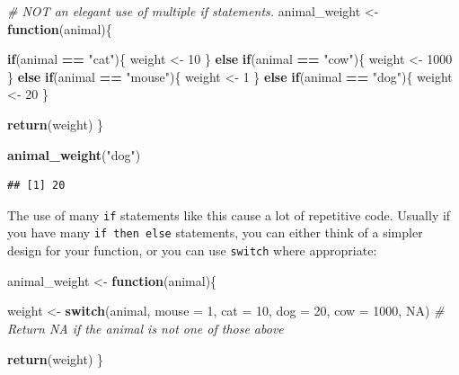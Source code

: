 \documentclass[]{book}
\newenvironment{Shaded}{\begin{snugshade}}{\end{snugshade}}
\newcommand{\CommentTok}[1]{\textcolor[rgb]{0.56,0.35,0.01}{\textit{#1}}}
\newcommand{\ControlFlowTok}[1]{\textcolor[rgb]{0.13,0.29,0.53}{\textbf{#1}}}
\newcommand{\DataTypeTok}[1]{\textcolor[rgb]{0.13,0.29,0.53}{#1}}
\newcommand{\DecValTok}[1]{\textcolor[rgb]{0.00,0.00,0.81}{#1}}
\newcommand{\KeywordTok}[1]{\textcolor[rgb]{0.13,0.29,0.53}{\textbf{#1}}}
\newcommand{\NormalTok}[1]{#1}
\newcommand{\OperatorTok}[1]{\textcolor[rgb]{0.81,0.36,0.00}{\textbf{#1}}}
\newcommand{\OtherTok}[1]{\textcolor[rgb]{0.56,0.35,0.01}{#1}}
\newcommand{\StringTok}[1]{\textcolor[rgb]{0.31,0.60,0.02}{#1}}
\begin{document}
\begin{Shaded}
\begin{Highlighting}[]
\CommentTok{# NOT an elegant use of multiple if statements.}
\NormalTok{animal_weight <-}\StringTok{ }\ControlFlowTok{function}\NormalTok{(animal)\{}
  
  \ControlFlowTok{if}\NormalTok{(animal }\OperatorTok{==}\StringTok{ "cat"}\NormalTok{)\{}
\NormalTok{    weight <-}\StringTok{ }\DecValTok{10}
\NormalTok{  \} }\ControlFlowTok{else} \ControlFlowTok{if}\NormalTok{(animal }\OperatorTok{==}\StringTok{ "cow"}\NormalTok{)\{}
\NormalTok{    weight <-}\StringTok{ }\DecValTok{1000}
\NormalTok{  \} }\ControlFlowTok{else} \ControlFlowTok{if}\NormalTok{(animal }\OperatorTok{==}\StringTok{ "mouse"}\NormalTok{)\{}
\NormalTok{    weight <-}\StringTok{ }\DecValTok{1}
\NormalTok{  \} }\ControlFlowTok{else} \ControlFlowTok{if}\NormalTok{(animal }\OperatorTok{==}\StringTok{ "dog"}\NormalTok{)\{}
\NormalTok{    weight <-}\StringTok{ }\DecValTok{20}
\NormalTok{  \}}
  
\KeywordTok{return}\NormalTok{(weight)}
\NormalTok{\}}


\KeywordTok{animal_weight}\NormalTok{(}\StringTok{"dog"}\NormalTok{)}
\end{Highlighting}
\end{Shaded}

\begin{verbatim}
## [1] 20
\end{verbatim}

The use of many \texttt{if} statements like this cause a lot of repetitive code. Usually if you have many \texttt{if\ then\ else} statements, you can either think of a simpler design for your function, or you can use \texttt{switch} where appropriate:

\begin{Shaded}
\begin{Highlighting}[]
\NormalTok{animal_weight <-}\StringTok{ }\ControlFlowTok{function}\NormalTok{(animal)\{}
  
  
\NormalTok{  weight <-}\StringTok{ }\ControlFlowTok{switch}\NormalTok{(animal, }
                   \DataTypeTok{mouse =} \DecValTok{1}\NormalTok{,}
                   \DataTypeTok{cat =} \DecValTok{10}\NormalTok{,}
                   \DataTypeTok{dog =} \DecValTok{20}\NormalTok{,}
                   \DataTypeTok{cow =} \DecValTok{1000}\NormalTok{,}
                   \OtherTok{NA}\NormalTok{)  }\CommentTok{# Return NA if the animal is not one of those above}
                   
\KeywordTok{return}\NormalTok{(weight)}
\NormalTok{\}}
\end{Highlighting}
\end{Shaded}
\end{document}
